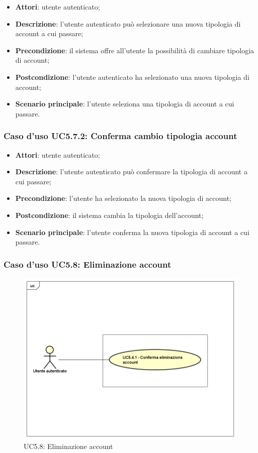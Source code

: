 \begin{itemize}
	\item \textbf{Attori}: utente autenticato;
	\item \textbf{Descrizione}: l'utente autenticato può selezionare una nuova tipologia di account a cui passare;
	\item \textbf{Precondizione}: il sistema offre all'utente la possibilità di cambiare tipologia di account;
	\item \textbf{Postcondizione}: l'utente autenticato ha selezionato  una nuova tipologia di account;
	\item \textbf{Scenario principale}: l'utente seleziona una tipologia di account a cui passare.
\end{itemize}

\subsubsection{Caso d'uso UC5.7.2: Conferma cambio tipologia account}

\begin{itemize}
	\item \textbf{Attori}: utente autenticato;
	\item \textbf{Descrizione}: l'utente autenticato può confermare la tipologia di account a cui passare;
	\item \textbf{Precondizione}: l'utente ha selezionato la nuova tipologia di account;
	\item \textbf{Postcondizione}: il sistema cambia la tipologia dell'account;
	\item \textbf{Scenario principale}: l'utente conferma la nuova tipologia di account a cui passare.
\end{itemize}

\subsubsection{Caso d'uso UC5.8: Eliminazione account}
\label{UC5.8}
\begin{figure}[h]
	\centering
	\includegraphics[scale=0.5,keepaspectratio]{UML/UC5_8.png}
	\caption{UC5.8: Eliminazione account}
\end{figure}


